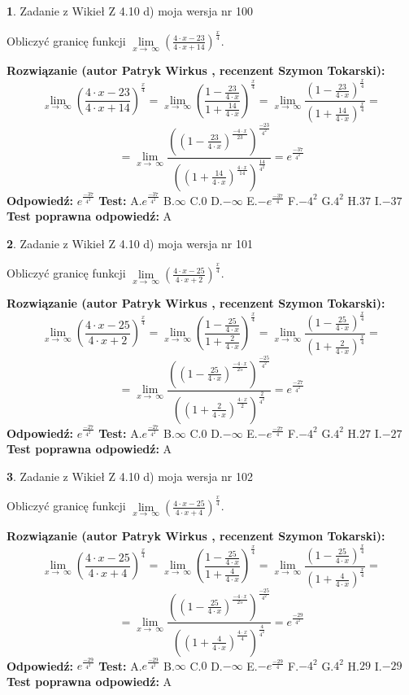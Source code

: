 \documentclass[12pt, a4paper]{article}
\theoremstyle{definition} %
\newtheorem{zad}{}
\newcommand{\zadStart}[1]{\begin{zad}#1\newline}
\newcommand{\zadStop}{\end{zad}}
\newcommand{\rozwStart}[2]{\noindent \textbf{Rozwiązanie (autor #1 , recenzent #2): }\newline}
\newcommand{\rozwStop}{\newline}
\newcommand{\odpStart}{\noindent \textbf{Odpowiedź:}\newline}
\newcommand{\odpStop}{\newline}
\newcommand{\testStart}{\noindent \textbf{Test:}\newline}
\newcommand{\testStop}{\newline}
\newcommand{\kluczStart}{\noindent \textbf{Test poprawna odpowiedź:}\newline}
\newcommand{\kluczStop}{\newline}
\begin{document}
\zadStart{Zadanie z Wikieł Z 4.10 d) moja wersja nr 100}


Obliczyć granicę funkcji  $\lim\limits_{x\to\ \infty}(\frac{4\cdot x-23}{4\cdot x+14})^{\frac{x}{4}}$.
\zadStop
\rozwStart{Patryk Wirkus}{Szymon Tokarski}
$$\lim\limits_{x\to\ \infty}(\frac{4\cdot x-23}{4\cdot x+14})^{\frac{x}{4}} = \lim\limits_{x\to\ \infty}(\frac{1-\frac{23}{4\cdot x}}{1+\frac{14}{4\cdot x}})^{\frac{x}{4}}=\lim\limits_{x\to\ \infty}\frac{(1-\frac{23}{4\cdot x})^{\frac{x}{4}}}{(1+\frac{14}{4\cdot x})^{\frac{x}{4}}}=$$
$$=\lim\limits_{x\to\ \infty}\frac{((1-\frac{23}{4\cdot x})^{\frac{-4\cdot x}{23}})^{\frac{-23}{4^{2}}}}{((1+\frac{14}{4\cdot x})^{\frac{4\cdot x}{14}})^{\frac{14}{4^{2}}}}=e^{\frac{-37}{4^{2}}}$$
\rozwStop
\odpStart
$e^{\frac{-37}{4^{2}}}$
\odpStop
\testStart
A.$e^{\frac{-37}{4^{2}}}$ B.$\infty$ C.$0$ D.$-\infty$ E.$-e^{\frac{-37}{4}}$
F.$-4^{2}$ G.$4^{2}$
H.$37$
I.$-37$
\testStop
\kluczStart
A
\kluczStop



\zadStart{Zadanie z Wikieł Z 4.10 d) moja wersja nr 101}


Obliczyć granicę funkcji  $\lim\limits_{x\to\ \infty}(\frac{4\cdot x-25}{4\cdot x+2})^{\frac{x}{4}}$.
\zadStop
\rozwStart{Patryk Wirkus}{Szymon Tokarski}
$$\lim\limits_{x\to\ \infty}(\frac{4\cdot x-25}{4\cdot x+2})^{\frac{x}{4}} = \lim\limits_{x\to\ \infty}(\frac{1-\frac{25}{4\cdot x}}{1+\frac{2}{4\cdot x}})^{\frac{x}{4}}=\lim\limits_{x\to\ \infty}\frac{(1-\frac{25}{4\cdot x})^{\frac{x}{4}}}{(1+\frac{2}{4\cdot x})^{\frac{x}{4}}}=$$
$$=\lim\limits_{x\to\ \infty}\frac{((1-\frac{25}{4\cdot x})^{\frac{-4\cdot x}{25}})^{\frac{-25}{4^{2}}}}{((1+\frac{2}{4\cdot x})^{\frac{4\cdot x}{2}})^{\frac{2}{4^{2}}}}=e^{\frac{-27}{4^{2}}}$$
\rozwStop
\odpStart
$e^{\frac{-27}{4^{2}}}$
\odpStop
\testStart
A.$e^{\frac{-27}{4^{2}}}$ B.$\infty$ C.$0$ D.$-\infty$ E.$-e^{\frac{-27}{4}}$
F.$-4^{2}$ G.$4^{2}$
H.$27$
I.$-27$
\testStop
\kluczStart
A
\kluczStop



\zadStart{Zadanie z Wikieł Z 4.10 d) moja wersja nr 102}


Obliczyć granicę funkcji  $\lim\limits_{x\to\ \infty}(\frac{4\cdot x-25}{4\cdot x+4})^{\frac{x}{4}}$.
\zadStop
\rozwStart{Patryk Wirkus}{Szymon Tokarski}
$$\lim\limits_{x\to\ \infty}(\frac{4\cdot x-25}{4\cdot x+4})^{\frac{x}{4}} = \lim\limits_{x\to\ \infty}(\frac{1-\frac{25}{4\cdot x}}{1+\frac{4}{4\cdot x}})^{\frac{x}{4}}=\lim\limits_{x\to\ \infty}\frac{(1-\frac{25}{4\cdot x})^{\frac{x}{4}}}{(1+\frac{4}{4\cdot x})^{\frac{x}{4}}}=$$
$$=\lim\limits_{x\to\ \infty}\frac{((1-\frac{25}{4\cdot x})^{\frac{-4\cdot x}{25}})^{\frac{-25}{4^{2}}}}{((1+\frac{4}{4\cdot x})^{\frac{4\cdot x}{4}})^{\frac{4}{4^{2}}}}=e^{\frac{-29}{4^{2}}}$$
\rozwStop
\odpStart
$e^{\frac{-29}{4^{2}}}$
\odpStop
\testStart
A.$e^{\frac{-29}{4^{2}}}$ B.$\infty$ C.$0$ D.$-\infty$ E.$-e^{\frac{-29}{4}}$
F.$-4^{2}$ G.$4^{2}$
H.$29$
I.$-29$
\testStop
\kluczStart
A
\kluczStop
\end{document}
